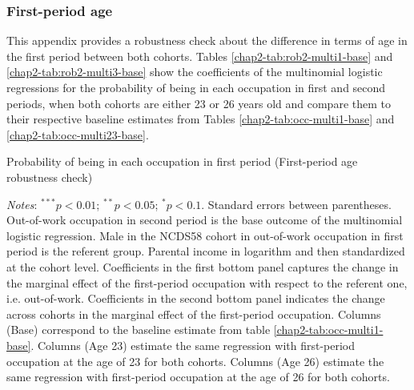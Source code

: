 \clearpage
\subsubsection{First-period age}

This appendix provides a robustness check about the difference in terms of age in the first period between both cohorts.
Tables \ref{chap2-tab:rob2-multi1-base} and \ref{chap2-tab:rob2-multi3-base} show the coefficients of the multinomial logistic regressions for the probability of being in each occupation in first and second periods, when both cohorts are either 23 or 26 years old and compare them to their respective baseline estimates from Tables \ref{chap2-tab:occ-multi1-base} and \ref{chap2-tab:occ-multi23-base}.


\begin{landscape}
\begin{table}[!htb]
    \centering
    \caption{Probability of being in each occupation in first period (First-period age robustness check)}
    \label{chap2-tab:rob2-multi1-base}
    \begin{threeparttable}
        \setlength{\tabcolsep}{-2pt}
        
        \begin{tablenotes}[flushleft]
            \footnotesize{\item\textit{Notes}: 
            $^{***}p<0.01$; $^{**}p<0.05$; $^{*}p<0.1$. Standard errors between parentheses. 
            Out-of-work occupation in second period is the base outcome of the multinomial logistic regression.
            Male in the NCDS58 cohort in out-of-work occupation in first period is the referent group. 
            Parental income in logarithm and then standardized at the cohort level. 
            Coefficients in the first bottom panel captures the change in the marginal effect of the first-period occupation with respect to the referent one, i.e. out-of-work. Coefficients in the second bottom panel indicates the change across cohorts in the marginal effect of the first-period occupation.
            Columns (Base) correspond to the baseline estimate from table \ref{chap2-tab:occ-multi1-base}. Columns (Age 23) estimate the same regression with first-period occupation at the age of 23 for both cohorts. Columns (Age 26) estimate the same regression with first-period occupation at the age of 26 for both cohorts.}
        \end{tablenotes}
    \end{threeparttable}
\end{table}
\end{landscape}

